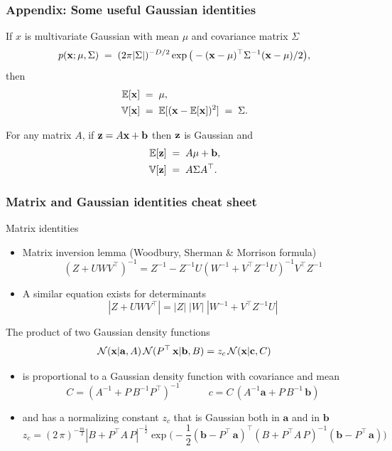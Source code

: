\begin{frame}

\frametitle{Appendix: Some useful Gaussian identities}
If $x$ is multivariate Gaussian with mean $\mu$ and
covariance matrix $\Sigma$
\[
p({\bf x}; \mu, \Sigma)\;=\;(2\pi|\Sigma|)^{-D/2}\exp\big(-({\bf
    x}-\mu)^\top\Sigma^{-1}({\bf x}-\mu)/2\big),
\]
then
\[
\begin{split}
\mathbb{E}[{\bf x}]\;&=\;\mu,\\
\mathbb{V}[{\bf x}]\;&=\;\mathbb{E}[({\bf x}-\mathbb{E}[{\bf x}])^2]\;=\;\Sigma.
\end{split}
\]

For any matrix $A$, if ${\bf z} = A{\bf x}+{\bf b}$ then ${\bf z}$ is Gaussian and
\[
\begin{split}
\mathbb{E}[{\bf z}] \;&=\; A\mu+{\bf b},\\
\mathbb{V}[{\bf z}] \;&=\;A\Sigma A^\top.
\end{split}
\]
\end{frame}

\begin{frame}
\frametitle{Matrix and Gaussian identities cheat sheet}

Matrix identities
\begin{itemize}
\item Matrix inversion lemma (Woodbury, Sherman \& Morrison formula)
%
\[
(Z+UWV^\top)^{-1}=Z^{-1}-Z^{-1}U(W^{-1}+V^\top Z^{-1}U)^{-1}V^\top Z^{-1}
\]
%
\item A similar equation exists for determinants
\[
|Z+UWV^\top|=|Z|\;|W|\;|W^{-1}+V^\top Z^{-1}U|
\]
\end{itemize}

The product of two Gaussian density functions
%
\[
\mathcal{N}(\mathbf x|{\mathbf a},A)\,\mathcal{N}(P^\top\,\mathbf x|{\mathbf b},B) = z_c\,
\mathcal{N}(\mathbf x|{\mathbf c},C)
\]
%
\vspace{-5mm}
\begin{itemize}
\item is proportional to a Gaussian density function with covariance and mean
%
\[
C = \left(A^{-1}+P\,B^{-1}P^\top\right)^{-1}\enspace \hspace{1cm} c =
C\,\left(A^{-1}{\mathbf a}+P\,B^{-1}\,{\mathbf b}\right)
\]
%
\item and has a normalizing constant $z_c$ that is Gaussian both in ${\mathbf
a}$ and in ${\mathbf b}$ 
%
\[
z_c = (2\,\pi)^{-\frac{m}{2}}|B+P^\top A\,P|^{-\frac{1}{2}}
\exp\big(-\frac{1}{2}({\mathbf b}-P^\top\,{\mathbf a})^\top
\left(B+P^\top A\,P\right)^{-1}({\mathbf b}-P^\top\,{\mathbf a})
\big)
\]
%
\end{itemize}
\end{frame}



